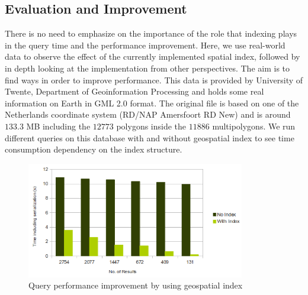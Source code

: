 \documentclass[a4paper,12pt]{article}
\begin{document}
\subsection{Evaluation and Improvement}
\label{BXevaluation}
There is no need to emphasize on the importance of the role that indexing plays in the query time and the performance improvement. Here, we use real-world data to observe the effect of the currently implemented spatial index, followed by in depth looking at the implementation from other perspectives. The aim is to find ways in order to improve performance. This data is provided by University of Twente, Department of Geoinformation Processing and holds some real information on Earth in GML 2.0 format. The original file is based on one of the Netherlands coordinate system (RD/NAP Amersfoort RD New) and is around $133.3$ MB including the $12773$ polygons inside the $11886$ multipolygons.
We run different queries on this database with and without geospatial index to see time consumption dependency on the index structure. 
\begin{figure}
\centering
\includegraphics[width=0.85\textwidth]{IndexEfficiency}
\caption{Query performance improvement by using geospatial index}
\label{figIndexEfficiency}
\end{figure}
\end{document}
